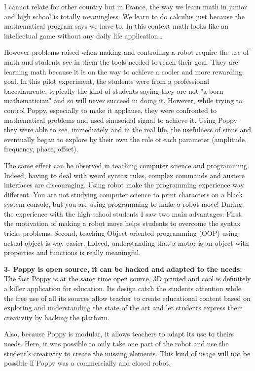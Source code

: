 I cannot relate for other country but in France, the way we learn math in junior and high school is totally meaningless. We learn to do calculus just because the mathematical program says we have to. In this context math looks like an intellectual game without any daily life application\dots

However problems raised when making and controlling a robot require the use of math and students see in them the tools needed to reach their goal. They are learning math because it is on the way to achieve a cooler and more rewarding goal. In this pilot experiment, the students were from a professional baccalaureate, typically the kind of students saying they are not "a born mathematician" and so will never succeed in doing it. However, while trying to control Poppy, especially to make it applause, they were confronted to mathematical problems and used sinusoidal signal to achieve it. Using Poppy they were able to see, immediately and in the real life, the usefulness of sinus and eventually began to explore by their own the role of each parameter (amplitude, frequency, phase, offset).

The same effect can be observed in teaching computer science and programming. Indeed, having to deal with weird syntax rules, complex commands and austere interfaces are discouraging. Using robot make the programming experience way different. You are not studying computer science to print characters on a black system console, but you are using programming to make a robot move!
During the experience with the high school students I saw two main advantages. First, the motivation of making a robot move helps students to overcome the syntax tricks problems. Second, teaching Object-oriented programming (OOP) using actual object is way easier. Indeed, understanding that a motor is an object with properties and functions is really meaningful.


\textbf{3- Poppy is open source, it can be hacked and adapted to the needs:}
The fact Poppy is at the same time open source, 3D printed and cool is definitely a killer application for education. Its design catch the students attention while the free use of all its sources allow teacher to create educational content based on exploring and understanding the state of the art and let students express their creativity by hacking the platform.


Also, because Poppy is modular, it allows teachers to adapt its use to theirs needs. Here, it was possible to only take one part of the robot and use the student’s creativity to create the missing elements. This kind of usage will not be possible if Poppy was a commercially and closed robot.

